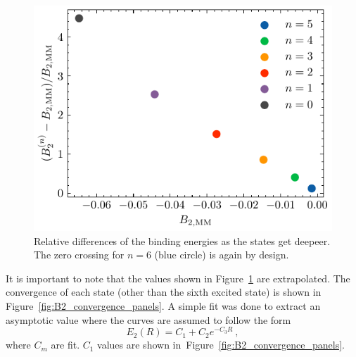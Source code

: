 \documentclass{article}
\begin{document}
\begin{figure}
  \centering
  \includegraphics{figures/B2_rel_diffs.pdf}
  \caption{Relative differences of the binding energies as the states get
  deepeer. The zero crossing for $n=6$ (blue circle) is again by
design.}\label{fig:B2_rel_diffs}
\end{figure}

It is important to note that the values shown in Figure~\ref{fig:B2_rel_diffs} are
extrapolated.
The convergence of each state (other than the sixth excited state) is shown in
Figure~\ref{fig:B2_convergence_panels}.
A simple fit was done to extract an asymptotic value where the curves are
assumed to follow the form
\begin{equation}
  E_2(R) = C_1 + C_2 e^{-C_3 R}~,
\end{equation}
where $C_m$ are fit.
$C_1$ values are shown in~Figure~\ref{fig:B2_convergence_panels}.
\end{document}
